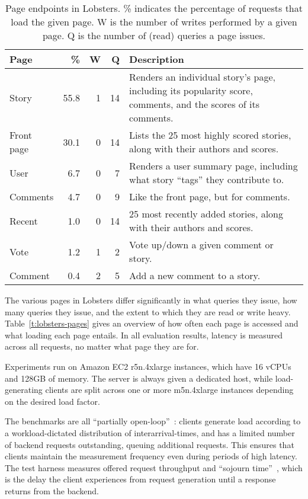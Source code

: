 \begin{table}
  \begin{tabular}{ p{0.8in} | r | r | r | p{2.9in} }
    Page & \% & W & Q & Description \\
    \hline
    Story & 55.8 & 1 & 14 & Renders an individual story's page, including its
    popularity score, comments, and the scores of its comments.\\
    Front page & 30.1 & 0 & 14 & Lists the 25 most highly scored stories, along
    with their authors and scores.\\
    User & 6.7 & 0 & 7 & Renders a user summary page, including what story
    ``tags'' they contribute to.\\
    Comments & 4.7 & 0 & 9 & Like the front page, but for comments.\\
    Recent & 1.0 & 0 & 14 & 25 most recently added stories, along with their
    authors and scores.\\
    Vote & 1.2 & 1 & 2 & Vote up/down a given comment or story.\\
    Comment & 0.4 & 2 & 5 & Add a new comment to a story.\\
  \end{tabular}
  \caption{Page endpoints in Lobsters. \% indicates the percentage of requests
  that load the given page. W is the number of writes performed by a given page.
  Q is the number of (read) queries a page issues.}
  \label{t:lobsters-pages}
\end{table}

The various pages in Lobsters differ significantly in what queries they issue,
how many queries they issue, and the extent to which they are read or write
heavy. Table~\vref{t:lobsters-pages} gives an overview of how often each page is
accessed and what loading each page entails. In all evaluation results, latency
is measured across all requests, no matter what page they are for.

Experiments run on Amazon EC2 r5n.4xlarge instances, which have 16 vCPUs and
128GB of memory. The server is always given a dedicated host, while
load-generating clients are split across one or more m5n.4xlarge instances
depending on the desired load factor.

The benchmarks are all ``partially open-loop''~\cite{frank-open-loop}:
clients generate load according to a workload-dictated distribution of
interarrival-times, and has a limited number of backend requests outstanding,
queuing additional requests. This ensures that clients maintain the measurement
frequency even during periods of high latency. The test harness measures offered
request throughput and ``sojourn time''~\cite{open-loop-cautionary-tale}, which
is the delay the client experiences from request generation until a response
returns from the backend.

